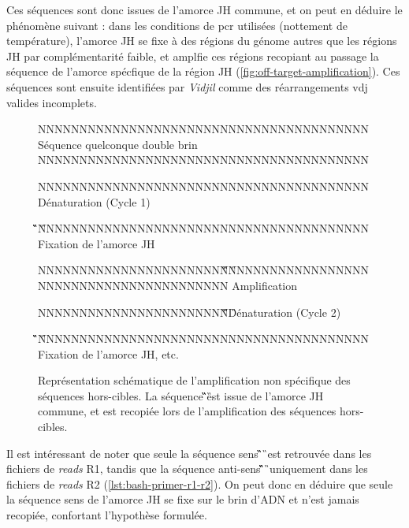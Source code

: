 \vspace{1em}

Ces séquences sont donc issues de l'amorce JH commune, et on peut en déduire le phénomène suivant :
dans les conditions de \gls{pcr} utilisées (nottement de température), l'amorce JH se fixe à des régions 
du génome autres que les régions JH par complémentarité faible, et amplfie ces régions recopiant au passage 
la séquence de l'amorce spécfique de la région JH (\autoref{fig:off-target-amplification}). Ces séquences sont ensuite 
identifiées par \textit{Vidjil} comme des réarrangements \gls{vdj} valides incomplets. 

\begin{figure}[H]
    \centering
    \begin{ColoredVerbatim}
        
        NNNNNNNNNNNNNNNNNNNNNNNNNNNNNNNNNNNNNNNN Séquence quelconque double brin
        NNNNNNNNNNNNNNNNNNNNNNNNNNNNNNNNNNNNNNNN

        NNNNNNNNNNNNNNNNNNNNNNNNNNNNNNNNNNNNNNNN Dénaturation (Cycle 1)

                               \C\G\T\C\T\C\C\T\C\A\G\G\T\A\A\G
        NNNNNNNNNNNNNNNNNNNNNNNNNNNNNNNNNNNNNNNN Fixation de l'amorce JH


        NNNNNNNNNNNNNNNNNNNNNNN\C\G\T\C\T\C\C\T\C\A\G\G\T\A\A\G
        NNNNNNNNNNNNNNNNNNNNNNNNNNNNNNNNNNNNNNNN Amplification

        NNNNNNNNNNNNNNNNNNNNNNN\C\G\T\C\T\C\C\T\C\A\G\G\T\A\A\G Dénaturation (Cycle 2)

                               \C\G\T\C\T\C\C\T\C\A\G\G\T\A\A\G
        NNNNNNNNNNNNNNNNNNNNNNNNNNNNNNNNNNNNNNNN Fixation de l'amorce JH, etc.
    \end{ColoredVerbatim}
    \caption{
        Représentation schématique de l'amplification non spécifique des séquences hors-cibles. 
        La séquence \C\G\T\C\T\C\C\T\C\A\G\G\T\A\A\G est issue de l'amorce JH commune, et est recopiée 
        lors de l'amplification des séquences hors-cibles.
    }
    \label{fig:off-target-amplification}
\end{figure}

Il est intéressant de noter que seule la séquence sens \C\G\T\C\T\C\C\T\C\A\G\G\T\A\A\G\ est retrouvée dans les fichiers de \textit{reads} 
R1, tandis que la séquence anti-sens \C\T\T\A\C\C\T\G\A\G\G\A\G\A\C\G\ uniquement dans les fichiers de \textit{reads} 
R2 (\autoref{lst:bash-primer-r1-r2}). On peut donc en déduire que seule la séquence sens de l'amorce JH se fixe sur 
le brin d'ADN et n'est jamais recopiée, confortant l'hypothèse formulée.


